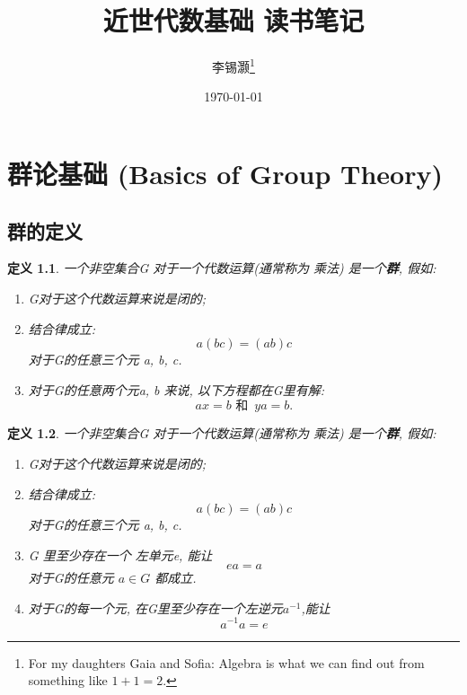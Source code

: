 \documentclass[utf8]{ctexbook}
\newtheorem{definition}{定义}[section]
\begin{document}
\title{近世代数基础 读书笔记}
\author{李锡灏\thanks{For my daughters Gaia and Sofia: Algebra is what we can find out from something like $1+1=2$.}}



\date{\today}
\maketitle



\newpage
\tableofcontents

\newpage

\chapter{群论基础 (Basics of Group Theory)}

\section{群的定义}

\begin{definition}\label{def_group_1}
一个非空集合G 对于一个代数运算(通常称为 乘法) 是一个\textbf{群}, 假如:
\begin{enumerate}
\item[I.]{G对于这个代数运算来说是闭的;}
\item[II.]{结合律成立:
	\begin{equation}
		a(bc) = (ab) c 	
	\end{equation}
对于G的任意三个元 a, b, c.}

\item[III.]{对于G的任意两个元a, b 来说, 以下方程都在G里有解:
\begin{equation}
ax = b \mbox{ 和 } \, y a = b.
\end{equation}
}
\end{enumerate}
\end{definition}

\begin{definition}\label{def_group_2}
一个非空集合G 对于一个代数运算(通常称为 乘法) 是一个\textbf{群}, 假如:
\begin{enumerate}
\item[I.]{G对于这个代数运算来说是闭的;}
\item[II.]{结合律成立:
	\begin{equation}
		a(bc) = (ab) c 	
	\end{equation}
对于G的任意三个元 a, b, c.}
\item[IV.]{G 里至少存在一个 左单元e, 能让
\begin{equation}
ea = a
\end{equation}
对于G的任意元 $a \in G$ 都成立.
}
\item[V.]{对于G的每一个元, 在G里至少存在一个左逆元$a^{-1}$,能让
\begin{equation}
	a^{-1} a = e
\end{equation}
}
\end{enumerate}
\end{definition}
\end{document}
